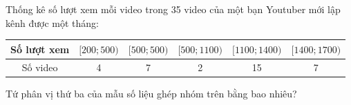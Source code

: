 \begin{ex}%
	Thống kê số lượt xem mỗi video trong 35 video của một bạn Youtuber mới lập kênh được một tháng:
\begin{center}
		\begin{tabular}{|c|c|c|c|c|c|}
		\hline
		Số lượt xem & {$[200;500)$} & {$[500;500)$} & $[500;1100)$ & $[1100;1400)$ & $[1400;1700)$ \\
		\hline
		Số video & 4 & 7 & 2 & 15 & 7 \\
		\hline
	\end{tabular}
\end{center}
	Tứ phân vị thứ ba của mẫu số liệu ghép nhóm trên bằng bao nhiêu?
\loigiai{
	Ta có $ Q_{3}=x_{27} \in [1100; 1400)$.\\
	Suy ra $Q_{3}=1100+\dfrac{\dfrac{3\cdot 35}{4}-13}{15}\cdot 300= 1365$.	
	}
	\end{ex}

